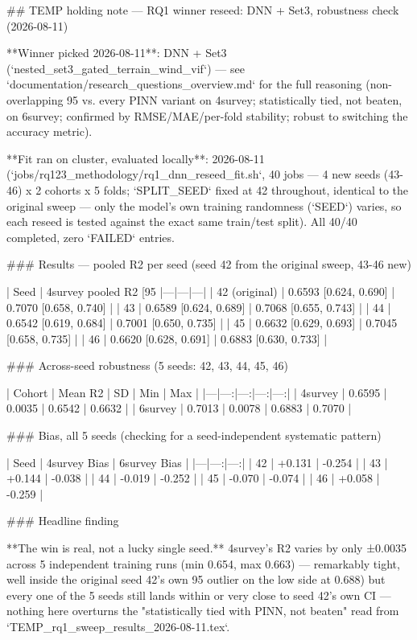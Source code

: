 ## TEMP holding note — RQ1 winner reseed: DNN + Set3, robustness check (2026-08-11)

**Winner picked 2026-08-11**: DNN + Set3 (`nested_set3_gated_terrain_wind_vif`) — see
`documentation/research_questions_overview.md` for the full reasoning (non-overlapping 95%
vs. every PINN variant on 4survey; statistically tied, not beaten, on 6survey; confirmed by
RMSE/MAE/per-fold stability; robust to switching the accuracy metric).

**Fit ran on cluster, evaluated locally**: 2026-08-11
(`jobs/rq123_methodology/rq1_dnn_reseed_fit.sh`, 40 jobs — 4 new seeds (43-46) x 2 cohorts x 5
folds; `SPLIT_SEED` fixed at 42 throughout, identical to the original sweep — only the model's
own training randomness (`SEED`) varies, so each reseed is tested against the exact same
train/test split). All 40/40 completed, zero `FAILED` entries.

### Results — pooled R2 per seed (seed 42 from the original sweep, 43-46 new)

| Seed | 4survey pooled R2 [95%
|---|---|---|
| 42 (original) | 0.6593 [0.624, 0.690] | 0.7070 [0.658, 0.740] |
| 43 | 0.6589 [0.624, 0.689] | 0.7068 [0.655, 0.743] |
| 44 | 0.6542 [0.619, 0.684] | 0.7001 [0.650, 0.735] |
| 45 | 0.6632 [0.629, 0.693] | 0.7045 [0.658, 0.735] |
| 46 | 0.6620 [0.628, 0.691] | 0.6883 [0.630, 0.733] |

### Across-seed robustness (5 seeds: 42, 43, 44, 45, 46)

| Cohort | Mean R2 | SD | Min | Max |
|---|---:|---:|---:|---:|
| 4survey | 0.6595 | 0.0035 | 0.6542 | 0.6632 |
| 6survey | 0.7013 | 0.0078 | 0.6883 | 0.7070 |

### Bias, all 5 seeds (checking for a seed-independent systematic pattern)

| Seed | 4survey Bias | 6survey Bias |
|---|---:|---:|
| 42 | +0.131 | -0.254 |
| 43 | +0.144 | -0.038 |
| 44 | -0.019 | -0.252 |
| 45 | -0.070 | -0.074 |
| 46 | +0.058 | -0.259 |

### Headline finding

**The win is real, not a lucky single seed.** 4survey's R2 varies by only ±0.0035 across 5
independent training runs (min 0.654, max 0.663) — remarkably tight, well inside the original
seed 42's own 95%
outlier on the low side at 0.688) but every one of the 5 seeds still lands within or very close to
seed 42's own CI — nothing here overturns the "statistically tied with PINN, not beaten" read
from `TEMP_rq1_sweep_results_2026-08-11.tex`.

